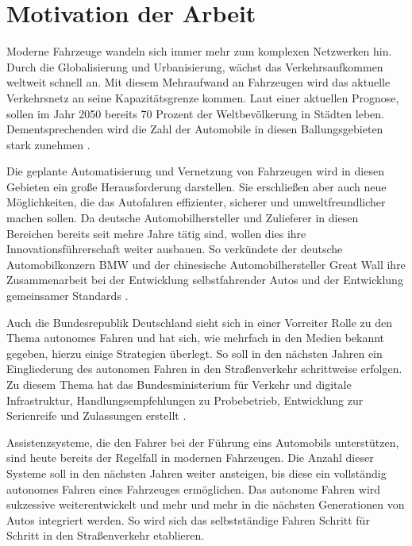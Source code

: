 \section{Motivation der Arbeit}

Moderne Fahrzeuge wandeln sich immer mehr zum komplexen Netzwerken hin. Durch die Globalisierung und Urbanisierung, wächst das Verkehrsaufkommen weltweit schnell an. Mit diesem Mehraufwand an Fahrzeugen wird das aktuelle Verkehrsnetz an seine Kapazitätsgrenze kommen. Laut einer aktuellen Prognose, sollen im Jahr 2050 bereits 70 Prozent der Weltbevölkerung in Städten leben. Dementsprechenden wird die Zahl der Automobile in diesen Ballungsgebieten stark zunehmen \cite{Urbanisierung}. 

Die geplante Automatisierung und Vernetzung von Fahrzeugen wird in diesen Gebieten ein große Herausforderung darstellen. Sie erschließen aber auch neue Möglichkeiten, die das Autofahren effizienter, sicherer und umweltfreundlicher machen sollen. Da deutsche Automobilhersteller und Zulieferer in diesen Bereichen bereits seit mehre Jahre tätig sind, wollen dies ihre Innovationsführerschaft weiter ausbauen. So verkündete der deutsche Automobilkonzern BMW und der chinesische Automobilhersteller Great Wall ihre Zusammenarbeit bei der Entwicklung selbstfahrender Autos und der Entwicklung gemeinsamer Standards \cite{BMW}.

Auch die Bundesrepublik Deutschland sieht sich in einer Vorreiter Rolle zu den Thema autonomes Fahren und hat sich, wie mehrfach in den Medien bekannt gegeben, hierzu einige Strategien überlegt. So soll in den nächsten Jahren ein Eingliederung des autonomen Fahren in den Straßenverkehr schrittweise erfolgen. Zu diesem Thema hat das Bundesministerium für Verkehr und digitale Infrastruktur, Handlungsempfehlungen zu Probebetrieb, Entwicklung zur Serienreife und Zulassungen erstellt \cite{BMVI}.

Assistenzsysteme, die den Fahrer bei der Führung eins Automobils unterstützen, sind heute bereits der Regelfall in modernen Fahrzeugen. Die Anzahl dieser Systeme soll in den nächsten Jahren weiter ansteigen, bis diese ein vollständig autonomes Fahren eines Fahrzeuges ermöglichen. Das autonome Fahren wird sukzessive weiterentwickelt und mehr und mehr in die nächsten Generationen von Autos integriert werden. So wird sich das selbstständige Fahren Schritt für Schritt in den Straßenverkehr etablieren.  

